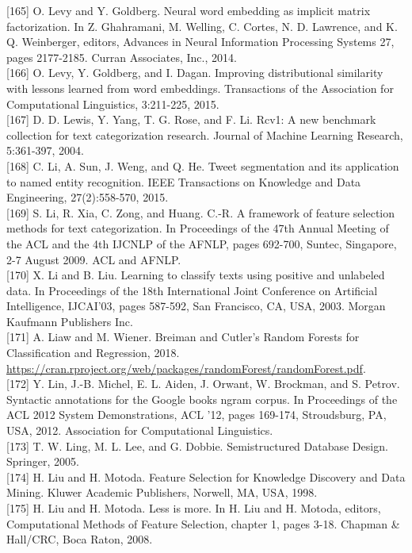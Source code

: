 \documentclass[10pt]{book}
\begin{document}
[165] O. Levy and Y. Goldberg. Neural word embedding as implicit matrix factorization. In Z. Ghahramani, M. Welling, C. Cortes, N. D. Lawrence, and K. Q. Weinberger, editors, Advances in Neural Information Processing Systems 27, pages 2177-2185. Curran Associates, Inc., 2014.\\[0pt]
[166] O. Levy, Y. Goldberg, and I. Dagan. Improving distributional similarity with lessons learned from word embeddings. Transactions of the Association for Computational Linguistics, 3:211-225, 2015.\\[0pt]
[167] D. D. Lewis, Y. Yang, T. G. Rose, and F. Li. Rcv1: A new benchmark collection for text categorization research. Journal of Machine Learning Research, 5:361-397, 2004.\\[0pt]
[168] C. Li, A. Sun, J. Weng, and Q. He. Tweet segmentation and its application to named entity recognition. IEEE Transactions on Knowledge and Data Engineering, 27(2):558-570, 2015.\\[0pt]
[169] S. Li, R. Xia, C. Zong, and Huang. C.-R. A framework of feature selection methods for text categorization. In Proceedings of the 47th Annual Meeting of the ACL and the 4th IJCNLP of the AFNLP, pages 692-700, Suntec, Singapore, 2-7 August 2009. ACL and AFNLP.\\[0pt]
[170] X. Li and B. Liu. Learning to classify texts using positive and unlabeled data. In Proceedings of the 18th International Joint Conference on Artificial Intelligence, IJCAI'03, pages 587-592, San Francisco, CA, USA, 2003. Morgan Kaufmann Publishers Inc.\\[0pt]
[171] A. Liaw and M. Wiener. Breiman and Cutler's Random Forests for Classification and Regression, 2018. \href{https://cran.rproject.org/web/packages/randomForest/randomForest.pdf}{https://cran.rproject.org/web/packages/randomForest/randomForest.pdf}.\\[0pt]
[172] Y. Lin, J.-B. Michel, E. L. Aiden, J. Orwant, W. Brockman, and S. Petrov. Syntactic annotations for the Google books ngram corpus. In Proceedings of the ACL 2012 System Demonstrations, ACL '12, pages 169-174, Stroudsburg, PA, USA, 2012. Association for Computational Linguistics.\\[0pt]
[173] T. W. Ling, M. L. Lee, and G. Dobbie. Semistructured Database Design. Springer, 2005.\\[0pt]
[174] H. Liu and H. Motoda. Feature Selection for Knowledge Discovery and Data Mining. Kluwer Academic Publishers, Norwell, MA, USA, 1998.\\[0pt]
[175] H. Liu and H. Motoda. Less is more. In H. Liu and H. Motoda, editors, Computational Methods of Feature Selection, chapter 1, pages 3-18. Chapman \& Hall/CRC, Boca Raton, 2008.\\[0pt]
\end{document}
